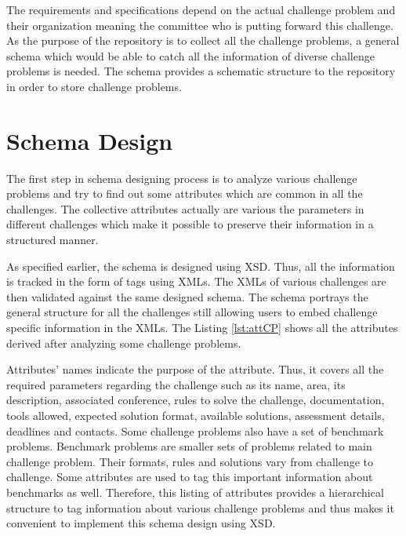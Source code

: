 \documentclass[11pt,letterpaper]{report}
\begin{document}
The requirements and specifications depend on the actual challenge problem and their organization meaning the committee who is putting forward this challenge. As the purpose of the repository is to collect all the challenge problems, a general schema which would be able to catch all the information of diverse challenge problems is needed. The schema provides a schematic structure to the repository in order to store challenge problems.  

\section{Schema Design} 
The first step in schema designing process is to analyze various challenge problems and try to find out some attributes which are common in all the challenges. The collective attributes actually are various the parameters in different challenges which make it possible to preserve their information in a structured manner. 

As specified earlier, the schema is designed using XSD. Thus, all the information is tracked in the form of tags using XMLs. The XMLs of various challenges are then validated against the same designed schema. The schema portrays the general structure for all the challenges still allowing users to embed challenge specific information in the XMLs. The Listing \ref{lst:attCP} shows all the attributes derived after analyzing some challenge problems.



\bigskip
Attributes' names indicate the purpose of the attribute. Thus, it covers all the required parameters regarding the challenge such as its name, area, its description, associated conference, rules to solve the challenge, documentation, tools allowed, expected solution format, available solutions, assessment details, deadlines and contacts. Some challenge problems also have a set of benchmark problems. Benchmark problems are smaller sets of problems related to main challenge problem. Their formats, rules and solutions vary from challenge to challenge. Some attributes are used to tag this important information about benchmarks as well. Therefore, this listing of attributes provides a hierarchical structure to tag information about various challenge problems and thus makes it convenient to implement this schema design using XSD.
\end{document}
